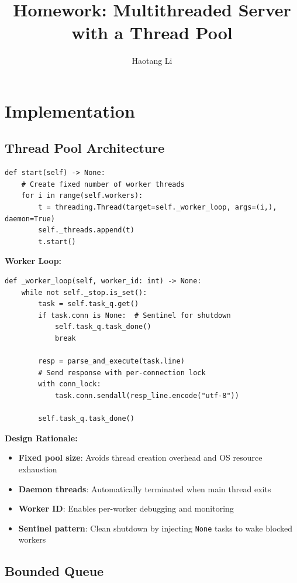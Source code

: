 \documentclass[12pt]{article}
\title{Homework: Multithreaded Server with a Thread Pool}
\author{Haotang Li}
\date{}
\begin{document}
\maketitle

\section{Implementation}

\subsection{Thread Pool Architecture}

\begin{lstlisting}
def start(self) -> None:
    # Create fixed number of worker threads
    for i in range(self.workers):
        t = threading.Thread(target=self._worker_loop, args=(i,), daemon=True)
        self._threads.append(t)
        t.start()
\end{lstlisting}

\textbf{Worker Loop:}
\begin{lstlisting}
def _worker_loop(self, worker_id: int) -> None:
    while not self._stop.is_set():
        task = self.task_q.get()
        if task.conn is None:  # Sentinel for shutdown
            self.task_q.task_done()
            break
        
        resp = parse_and_execute(task.line)
        # Send response with per-connection lock
        with conn_lock:
            task.conn.sendall(resp_line.encode("utf-8"))
        
        self.task_q.task_done()
\end{lstlisting}

\textbf{Design Rationale:}

\begin{itemize}
    \item \textbf{Fixed pool size}: Avoids thread creation overhead and OS resource exhaustion
    \item \textbf{Daemon threads}: Automatically terminated when main thread exits
    \item \textbf{Worker ID}: Enables per-worker debugging and monitoring
    \item \textbf{Sentinel pattern}: Clean shutdown by injecting \texttt{None} tasks to wake blocked workers
\end{itemize}

\pagebreak

\subsection{Bounded Queue}
\end{document}
